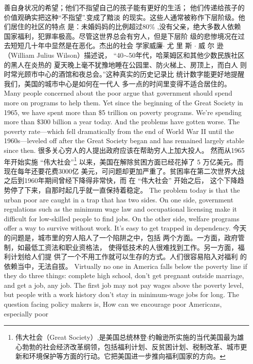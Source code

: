 \begin{paracol}{2}
善自身状况的希望；他们不指望自己的孩子能有更好的生活；
他们传递给孩子的价值观确实把这种“不指望”.变成了黯淡
的现实。这些人通常被称作下层阶级。他们居住的社区的特点
是：未婚妈妈的比例超过80\% ,没有父亲，绝大多数人依赖
国家福利，犯罪率极高。尽管这世界总会有穷人，但是下层阶
级的悲惨境况在过去短短几十年中显然是在恶化。杰出的社会
学家威廉$\cdot$ 尤 里 斯 $\cdot$ 威 尔 逊 （William  Julius Wilson）描述说，
“40$\sim$50年代，哈莱姆区和其他少数民族社区的黑人在炎热的
夏天晚上毫不犹豫地睡在公园里、防火梯上、房顶上，而白人
则时常光顾市中心的酒馆和夜总会。”这种真实的历史记录比
统计数字能更好地提醒我们，美国的城市中心是如何在一代人
多一点的时间里变得不适合居住的。
\switchcolumn*
Many people concerned about the poor argue that government should spend more on programs to help them. Yet since
the beginning of the Great Society in 1965, we have spent more
than \$5 trillion on poverty programs. We're spending more
than \$300 billion a year today. And the problems have gotten
worse. The poverty rate---which fell dramatically from the end
of World War II until the 1960s---leveled off after the Great
Society began and has remained largely stable since then.
\switchcolumn
很多关心穷人的人提出政府应该在帮助穷人上加大投人。
然而从1965年开始实施 “伟大社会”\footnote{伟大社会（Great Society）,是美国总统林登$\cdot$约翰逊所实施的当代美国最为雄心勃勃的社会经济改革纲领，包括福利计划、反贫困计划、税制改革、城市更新和环境保护等方面的行动。它把美国进一步推向福利国家的方向。} 以来，美国在解除贫困方面已经花掉了 5 万亿美元。而现在每年还要花费3000亿
美元，可问题却更加严重了。贫困率在第二次世界大战之后到1960年期间曾经下降得非常快，而 在 “伟大社会” 开始之后，
这个下降趋势停了下来，自那时起几乎就一直保持着稳定。
\switchcolumn*
The problem today is that the urban poor are caught in a
trap that has two sides. On one side, government regulations
such as the minimum wage law and occupational licensing
make it difficult for low-skilled people to find jobs. On the
other side, welfare programs offer a way to survive without
work. It's easy to get trapped in dependency.
\switchcolumn
今天的问题是，城市里的穷人陷人了一个陷阱之中，包括
两个方面。一方面，政府管制，如最低工资法和职业资格法，
使得低技术的人很难找到工作。另一方面，福利计划给人们提
供了一个不用工作就可以生存的方式。人们很容易陷入对福利
的依赖当中，无法自拔。
\switchcolumn*
Virtually no one in America falls below the poverty line if they
do three things: complete high school, don't get pregnant outside
marriage, and get a job, any job. The first job may not pay wages
above the poverty level, but people with a work history don't stay
in minimum-wage jobs for long. The question facing policy makers is, How can we encourage poor Americans, especially poor

\end{paracol}
